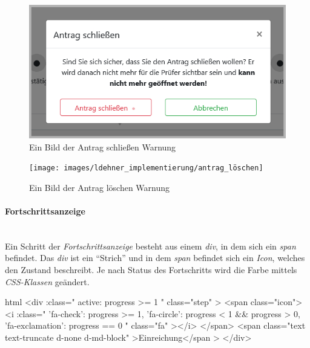 \begin{figure}[H]
	\centering
	\includegraphics[width=0.45\linewidth]{images/ldehner_implementierung/antrag_schliessen}
	\caption[Antrag schließen Warnung]{Ein Bild der Antrag schließen Warnung}
	\label{fig:antragschliessen}
\end{figure}
\begin{figure}[H]
	\centering
	\texttt{[image: images/ldehner\_implementierung/antrag\_löschen]}
	\caption[Antrag löschen Warnung]{Ein Bild der Antrag löschen Warnung}
	\label{fig:antragloeschen}
\end{figure}

\paragraph{Fortschrittsanzeige}
~\\
Ein Schritt der \textit{Fortschrittsanzeige} besteht aus einem \textit{div}, in dem sich ein \textit{span} befindet. Das \textit{div} ist ein \enquote{Strich} und in dem \textit{span} befindet sich ein \textit{Icon}, welches den Zustand beschreibt. Je nach Status des Fortschritts wird die Farbe mittels \textit{CSS-Klassen} geändert.
\begin{code}{html}
	<div
            :class="{
              active: progress >= 1
            }"
            class="step"
          >
            <span class="icon">
              <i
                :class="{
                  'fa-check': progress >= 1,
                  'fa-circle': progress < 1 && progress > 0,
                  'fa-exclamation': progress == 0
                }"
                class="fa"
              ></i>
            </span>
            <span class="text text-truncate d-none d-md-block"
              >Einreichung</span
            >
          </div>
\end{code}
	\label{list:codeprogress} ~\\

	\label{list:progresscolor} ~\\

